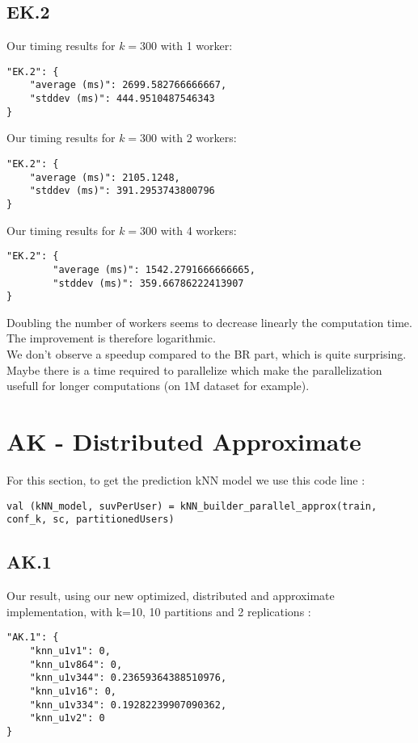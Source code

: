 \documentclass{article}
\begin{document}
\subsection{EK.2}
Our timing results for $k=300$ with 1 worker:
\begin{lstlisting}[style=json]
"EK.2": {
    "average (ms)": 2699.582766666667,
    "stddev (ms)": 444.9510487546343
}
\end{lstlisting}

Our timing results for $k=300$ with 2 workers:
\begin{lstlisting}[style=json]
"EK.2": {
    "average (ms)": 2105.1248,
    "stddev (ms)": 391.2953743800796
}
\end{lstlisting}

Our timing results for $k=300$ with 4 workers:
\begin{lstlisting}[style=json]
"EK.2": {
        "average (ms)": 1542.2791666666665,
        "stddev (ms)": 359.66786222413907
}
\end{lstlisting}

Doubling the number of workers seems to decrease linearly the computation time. The improvement is therefore logarithmic. \\
We don't observe a speedup compared to the BR part, which is quite surprising. Maybe there is a time required to parallelize which make the parallelization usefull for longer computations (on 1M dataset for example).

\section{AK - Distributed Approximate}
For this section, to get the prediction kNN model we use this code line :
\begin{lstlisting}[style=scala]
val (kNN_model, suvPerUser) = kNN_builder_parallel_approx(train, conf_k, sc, partitionedUsers)
\end{lstlisting}

\subsection{AK.1}
Our result, using our new optimized, distributed and approximate implementation, with k=10, 10 partitions and 2 replications :
\begin{lstlisting}[style=json]
"AK.1": {
    "knn_u1v1": 0,
    "knn_u1v864": 0,
    "knn_u1v344": 0.23659364388510976,
    "knn_u1v16": 0,
    "knn_u1v334": 0.19282239907090362,
    "knn_u1v2": 0
}
\end{lstlisting}
\end{document}
